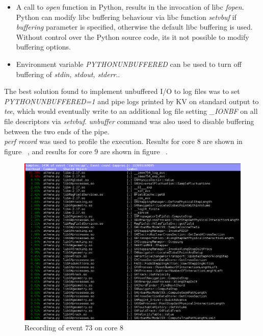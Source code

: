 \documentclass[a4paper]{jpconf}
\begin{document}
\begin{itemize}
\item A call to \textit{open} function in Python, results in the invocation
of libc \textit{fopen}. Python can modify libc buffering behaviour via libc 
function \textit{setvbuf} if \textit{buffering} parameter is specified, 
otherwise the default libc buffering is used. Without control over the Python
source code, its it not possible to modify buffering options.
\item Environment variable \textit{PYTHONUNBUFFERED} can be used to turn off
buffering of \textit{stdin, stdout, stderr}.. 
\end{itemize}
The best solution found to implement unbuffered I/O to log files was to set 
\textit{PYTHONUNBUFFERED=1} and pipe logs printed by KV on standard output to
\textit{tee}, which would eventually write to an additional log file setting 
\textit{\_IONBF} on all file descriptors via \textit{setvbuf}.
\textit{unbuffer} command was also used to disable buffering between the two
ends of the pipe. 
\\
\textit{perf record} was used to profile the execution. Results for core 8 
are shown in figure ~\cite{event-73-processor8}, and results for core 9 are 
shown in figure ~\cite{event-73-processor9}.

\begin{figure}[h]
\begin{center}
\includegraphics[scale=0.45]{images/Event73_Processor8.png}
\end{center}
\caption{\label{event-73-processor8} Recording of event 73 on core 8}
\end{figure}
\end{document}
